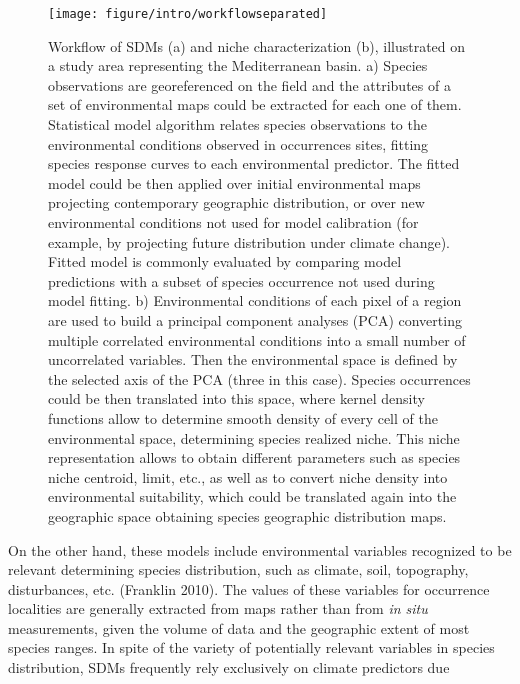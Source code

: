 \documentclass[11pt,twoside]{reedthesis}
\begin{document}
\setlength{\abovecaptionskip}{-30pt}
\begin{figure}[hbt!]

{\centering \texttt{[image: figure/intro/workflowseparated]} 

}

\caption[Workflow processes in species distribution modeling (SDM) and niche characterization in the environmenta space]{Workflow of SDMs (a) and niche characterization (b), illustrated on a study area representing the Mediterranean basin. a) Species observations are georeferenced on the field and the attributes of a set of environmental maps could be extracted for each one of them.  Statistical model algorithm relates species observations to the environmental conditions observed in occurrences sites, fitting species response curves to each environmental predictor. The fitted model could be then applied over initial environmental maps projecting contemporary geographic distribution, or over new environmental conditions not used for model calibration (for example, by projecting future distribution under climate change). Fitted model is commonly evaluated by comparing model predictions with a subset of species occurrence not used during model fitting. b) Environmental conditions of each pixel of a region are used to build a principal component analyses (PCA) converting multiple correlated environmental conditions into a small number of uncorrelated variables. Then the environmental space is defined by the selected axis of the PCA (three in this case). Species occurrences could be then translated into this space, where kernel density functions allow to determine smooth density of every cell of the environmental space, determining species realized niche. This niche representation allows to obtain different parameters such as species niche centroid, limit, etc., as well as to convert niche density into environmental suitability, which could be translated again into the geographic space obtaining species geographic distribution maps.}\label{fig:introplot2}
\end{figure}
On the other hand, these models include environmental variables
recognized to be relevant determining species distribution, such as
climate, soil, topography, disturbances, etc. (Franklin 2010). The
values of these variables for occurrence localities are generally
extracted from maps rather than from \emph{in situ} measurements, given
the volume of data and the geographic extent of most species ranges. In
spite of the variety of potentially relevant variables in species
distribution, SDMs frequently rely exclusively on climate predictors due
\end{document}
